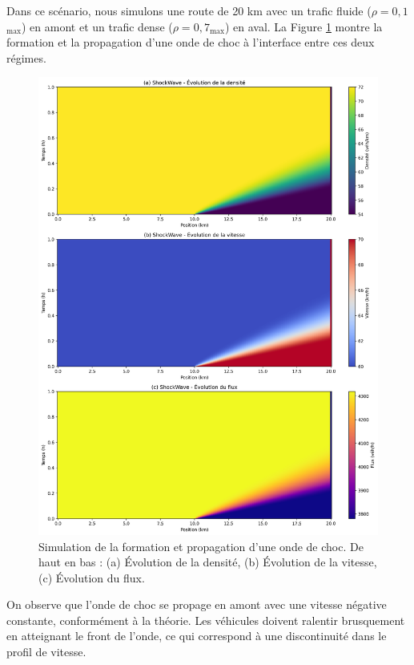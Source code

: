 Dans ce scénario, nous simulons une route de 20 km avec un trafic fluide ($\rho = 0,1$\rho$_{\max}$) en amont et un trafic dense ($\rho = 0,7$\rho$_{\max}$) en aval. La Figure \ref{fig:sim_onde_choc} montre la formation et la propagation d'une onde de choc à l'interface entre ces deux régimes.

\begin{figure}[htbp]
\centering
\includegraphics[width=1.0\textwidth]{simulations/LWR/shock/ShockWave_combined}
\caption{Simulation de la formation et propagation d'une onde de choc. De haut en bas : (a) Évolution de la densité, (b) Évolution de la vitesse, (c) Évolution du flux.}
\label{fig:sim_onde_choc}
\end{figure}


On observe que l'onde de choc se propage en amont avec une vitesse négative constante, conformément à la théorie. Les véhicules doivent ralentir brusquement en atteignant le front de l'onde, ce qui correspond à une discontinuité dans le profil de vitesse.

